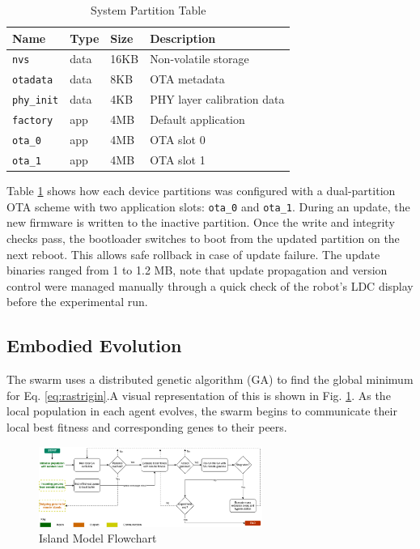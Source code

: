 \documentclass[conference]{IEEEtran}
\begin{document}
\begin{table}[h]
  \centering
  \caption{System Partition Table}
  \begin{tabular}{l l l p{4.3cm}}
  \toprule
  \textbf{Name} & \textbf{Type} & \textbf{Size} & \textbf{Description} \\
  \midrule
  \texttt{nvs} & data & 16KB & Non-volatile storage \\
  \texttt{otadata} & data & 8KB & OTA metadata \\
  \texttt{phy\_init} & data & 4KB & PHY layer calibration data \\
  \texttt{factory} & app & 4MB & Default application \\
  \texttt{ota\_0} & app & 4MB & OTA slot 0 \\
  \texttt{ota\_1} & app & 4MB & OTA slot 1 \\
  \bottomrule
  \end{tabular}
  \label{tab:partition_table}
\end{table}


Table \ref{tab:partition_table} shows how each device partitions was configured with a dual-partition OTA scheme with two application slots: \texttt{ota\_0} and \texttt{ota\_1}. During an update, the new firmware is written to the inactive partition. Once the write and integrity checks pass, the bootloader switches to boot from the updated partition on the next reboot. This allows safe rollback in case of update failure. The update binaries ranged from 1 to 1.2 MB, note that update propagation and version control were managed manually through a quick check of the robot's LDC display before the experimental run.

\subsection{Embodied Evolution}

The swarm uses a distributed genetic algorithm (GA) to find the global minimum for Eq. \ref{eq:rastrigin}.A visual representation of this is shown in Fig. \ref{fig:ga}. As the local population in each agent evolves, the swarm begins to communicate their local best fitness and corresponding genes to their peers.\\

\begin{figure}[t]
    \centering
    \includegraphics[width=0.65\textwidth]{ga.png}
    \caption{Island Model Flowchart}
    \label{fig:ga}
\end{figure}
\end{document}
